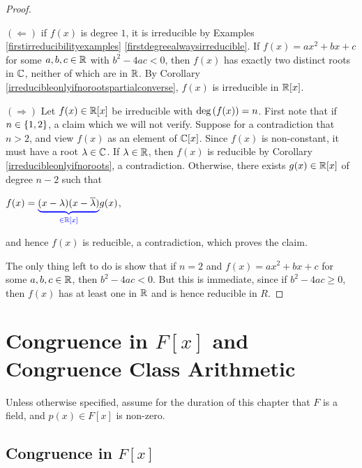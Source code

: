 \documentclass[11pt,fleqn,dvipsnames,usenames]{article}
\newcommand{\p}{\noindent}
\begin{document}
\begin{proof}~

\p $(\Leftarrow)$ if $f(x)$ is degree $1$, it is irreducible by Examples \ref{firstirreducibilityexamples} \ref{firstdegreealwaysirreducible}.  If $f(x) = ax^2 + bx + c$ for some $a,b,c\in\mathbb{R}$ with $b^2 - 4ac < 0$, then $f(x)$ has exactly two distinct roots in $\mathbb{C}$, neither of which are in $\mathbb{R}$.  By Corollary \ref{irreducibleonlyifnorootspartialconverse}, $f(x)$ is irreducible in $\mathbb{R}[x]$.
\vsp

\p $(\Rightarrow)$ Let $f(x)\in\mathbb{R}[x]$ be irreducible with $\text{deg}\left(f(x)\right) = n$.  First note that if $n\in\left\{1,2\right\}$, a claim which we will not verify.  Suppose for a contradiction that $n>2$, and view $f(x)$ as an element of $\mathbb{C}[x]$.  Since $f(x)$ is non-constant, it must have a root $\lambda\in\mathbb{C}$.  If $\lambda\in\mathbb{R}$, then $f(x)$ is reducible by Corollary \ref{irreducibleonlyifnoroots}, a contradiction.  Otherwise, there exists $g(x)\in\mathbb{R}[x]$ of degree $n-2$ such that
\begin{center}
$f(x) = {\color{blue}\underbrace{{\color{black}(x-\lambda)(x-\overline{\lambda})}}_{\in\mathbb{R}[x]}}g(x)$,
\end{center}
and hence $f(x)$ is reducible, a contradiction, which proves the claim.
\vsp

\p The only thing left to do is show that if $n=2$ and $f(x) = ax^2 + bx + c$ for some $a,b,c\in\mathbb{R}$, then $b^2 - 4ac < 0$.  But this is immediate, since if $b^2 - 4ac\geq 0$, then $f(x)$ has at least one in $\mathbb{R}$ and is hence reducible in $R$.
\end{proof}
%
\section{Congruence in \texorpdfstring{$F[x]$}{F[x]} and Congruence Class Arithmetic}

\p Unless otherwise specified, assume for the duration of this chapter that $F$ is a field, and $p(x)\in F[x]$ is non-zero.

\subsection{Congruence in \texorpdfstring{$F[x]$}{F[x]}}
\end{document}
